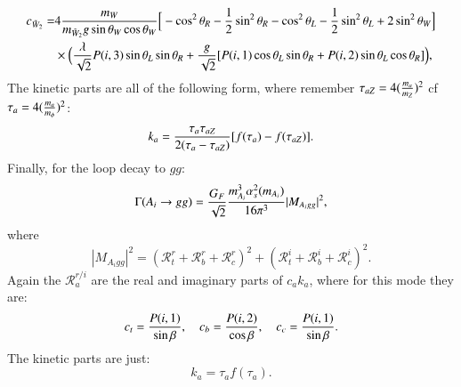 \documentclass[final,3p,times,pdflatex]{elsarticle}
\begin{document}
\begin{equation}
\begin{aligned}
c_{\tilde{W}_2} = & 4{m_{W} \over m_{\tilde{W}_2} g \sin\theta_W \cos\theta_W}\Big[-\cos^2 \theta_R - {1 \over 2}\sin^2 \theta_R - \cos^2 \theta_L - {1 \over 2}\sin^2 \theta_L + 2\sin^2 \theta_W\Big] \\ & \times \Big({\lambda \over \sqrt{2}}P(i,3)\sin\theta_L \sin\theta_R + {g \over \sqrt{2}}[P(i,1)\cos\theta_L \sin\theta_R + P(i,2)\sin\theta_L \cos\theta_R]\Big),
\end{aligned}
\end{equation}
The kinetic parts are all of the following form, where remember $\tau_{aZ} = 4({m_{a} \over m_{Z}})^2$ cf $\tau_{a} = 4({m_{a} \over m_{\phi}})^2$:
\begin{equation}
k_{a} = {\tau_{a}\tau_{aZ} \over 2(\tau_{a} - \tau_{aZ})}[f(\tau_{a})-f(\tau_{aZ})].
\end{equation}
Finally, for the loop decay to $gg$:
\begin{equation} \label{AggNMSSM}
\Gamma(A_i \rightarrow g g) = {G_{F} \over \sqrt{2}} {m_{A_i}^3 \alpha_s^2(m_{A_i}) \over 16 \pi^3} |M_{A_i gg}|^2,
\end{equation}
where 
\begin{equation}
|M_{A_i gg}|^2 = (\mathcal{R}_{t}^{r} + \mathcal{R}_{b}^{r} + \mathcal{R}_{c}^{r})^2 + (\mathcal{R}_{t}^{i} + \mathcal{R}_{b}^{i} + \mathcal{R}_{c}^{i})^2.
\end{equation}
Again the $\mathcal{R}_{a}^{r/i}$ are the real and imaginary parts of $c_{a}k_{a}$, where for this mode they are:
\begin{equation}
c_{t} = {P(i,1) \over \sin\beta}, \quad \quad \\
c_{b} = {P(i,2) \over \cos\beta}, \quad \quad \\
c_{c} = {P(i,1) \over \sin\beta}. \\
\end{equation}
The kinetic parts are just:
\begin{equation}
k_{a} = \tau_{a} f({\tau_a}).
\end{equation}
\end{document}
